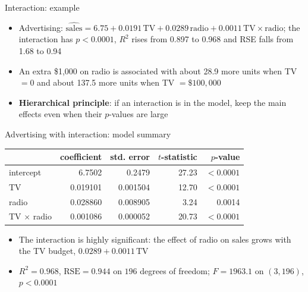 \begin{frame}{Interaction: example}
    \begin{itemize}
        \item Advertising: $\widehat{\text{sales}} = 6.75 + 0.0191\,\text{TV} + 0.0289\,\text{radio} + 0.0011\,\text{TV} \times \text{radio}$; the interaction has $p < 0.0001$, $R^2$ rises from 0.897 to 0.968 and RSE falls from 1.68 to 0.94
        \item An extra \$1,000 on radio is associated with about 28.9 more units when TV $= 0$ and about 137.5 more units when TV $= \$100{,}000$
        \item \textbf{Hierarchical principle}: if an interaction is in the model, keep the main effects even when their $p$-values are large
    \end{itemize}
\end{frame}


\begin{frame}{Advertising with interaction: model summary}
    \begin{center}
        \small
        \begin{tabular}{lrrrr}
            \toprule
            & coefficient & std. error & $t$-statistic & $p$-value \\
            \midrule
            intercept & 6.7502 & 0.2479 & 27.23 & $<0.0001$ \\
            TV & 0.019101 & 0.001504 & 12.70 & $<0.0001$ \\
            radio & 0.028860 & 0.008905 & 3.24 & 0.0014 \\
            TV $\times$ radio & 0.001086 & 0.000052 & 20.73 & $<0.0001$ \\
            \bottomrule
        \end{tabular}
    \end{center}
    \begin{itemize}
        \item The interaction is highly significant: the effect of radio on sales grows with the TV budget, $0.0289 + 0.0011\,\text{TV}$
        \item $R^2 = 0.968$, $\mathrm{RSE} = 0.944$ on $196$ degrees of freedom; $F = 1963.1$ on $(3, 196)$, $p < 0.0001$
    \end{itemize}
\end{frame}



